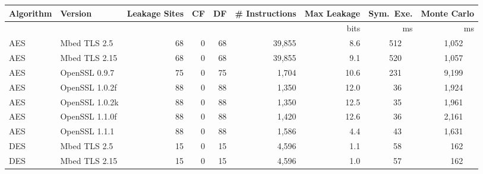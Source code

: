 \begin{table}[h]
{    \begin{tabular}{llrrrrrrr}
        \hline
        \textbf{Algorithm} & \textbf{Version}  & \textbf{Leakage Sites} & \textbf{CF}         & \textbf{DF}
                           & \textbf{\# Instructions} & \textbf{Max Leakage}   & \textbf{Sym.\ Exe.} & \textbf{Monte Carlo}                                                    \\\hline
                           &                          &                        &                     &                      &             & bits & ms        & ms              \\\cline{7-9}
        AES                & Mbed TLS 2.5             & 68                     & 0                   & 68                   & 39,855      & 8.6  & 512 ~~    & 1,052 ~~        \\
        AES                & Mbed TLS 2.15            & 68                     & 0                   & 68                   & 39,855      & 9.1  & 520 ~~    & 1,057 ~~        \\
        AES                & OpenSSL 0.9.7            & 75                     & 0                   & 75                   & 1,704       & 10.6 & 231 ~~    & 9,199 ~~        \\
        AES                & OpenSSL 1.0.2f           & 88                     & 0                   & 88                   & 1,350       & 12.0 & 36 ~~     & 1,924 ~~        \\
        AES                & OpenSSL 1.0.2k           & 88                     & 0                   & 88                   & 1,350       & 12.5 & 35 ~~     & 1,961 ~~        \\
        AES                & OpenSSL 1.1.0f           & 88                     & 0                   & 88                   & 1,420       & 12.6 & 36 ~~     & 2,161 ~~        \\
        AES                & OpenSSL 1.1.1            & 88                     & 0                   & 88                   & 1,586       & 4.4  & 43 ~~     & 1,631 ~~        \\
        DES                & Mbed TLS 2.5             & 15                     & 0                   & 15                   & 4,596       & 1.1  & 58 ~~     & 162 ~~          \\
        DES                & Mbed TLS 2.15            & 15                     & 0                   & 15                   & 4,596       & 1.0  & 57 ~~     & 162 ~~          \\

\end{tabular}}
\end{table}
